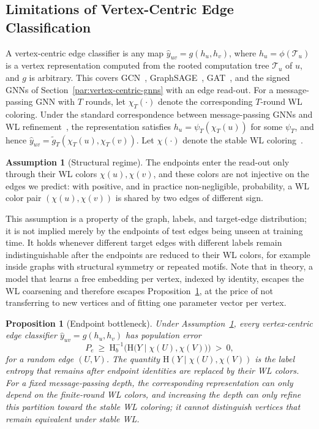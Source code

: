\documentclass[sigconf, review, anonymous]{acmart}
\newcommand{\Hh}{\mathrm{H}}
\theoremstyle{plain}
\newtheorem{proposition}{Proposition}
\theoremstyle{definition}
\newtheorem{assumption}{Assumption}
\begin{document}
\subsection{Limitations of Vertex-Centric Edge Classification}
A vertex-centric edge classifier is any map $\hat y_{uv}=g(h_u,h_v)$, where $h_u=\phi(\mathcal{T}_u)$ is a vertex representation computed from the rooted computation tree $\mathcal{T}_u$ of $u$, and $g$ is arbitrary. This covers GCN~\citep{kipf2017semi}, GraphSAGE~\citep{hamilton2017inductive}, GAT~\citep{velickovic2018graph}, and the signed GNNs of Section~\ref{par:vertex-centric-gnns} with an edge read-out. For a message-passing GNN with $T$ rounds, let $\chi_T(\cdot)$ denote the corresponding $T$-round WL coloring. Under the standard correspondence between message-passing GNNs and WL refinement~\citep{xu2019powerful, morris2019weisfeiler}, the representation satisfies $h_u=\psi_T(\chi_T(u))$ for some $\psi_T$, and hence $\hat y_{uv}=\tilde g_T(\chi_T(u),\chi_T(v))$. Let $\chi(\cdot)$ denote the stable WL coloring~\citep{weisfeiler1968reduction}. 

\begin{assumption}[Structural regime]
\label{as:structural}
The endpoints enter the read-out only through their WL colors $\chi(u),\chi(v)$, and these colors are not injective on the edges we predict: with positive, and in practice non-negligible, probability, a WL color pair $(\chi(u),\chi(v))$ is shared by two edges of different sign.
\end{assumption}

This assumption is a property of the graph, labels, and target-edge distribution; it is not implied merely by the endpoints of test edges being unseen at training time. It holds whenever different target edges with different labels remain indistinguishable after the endpoints are reduced to their WL colors, for example inside graphs with structural symmetry or repeated motifs. Note that in theory, a model that learns a free embedding per vertex, indexed by identity, escapes the WL coarsening and therefore escapes Proposition~\ref{prop:bottleneck}, at the price of not transferring to new vertices and of fitting one parameter vector per vertex.

\begin{proposition}[Endpoint bottleneck]
\label{prop:bottleneck}
Under Assumption~\ref{as:structural}, every vertex-centric edge classifier $\hat y_{uv}=g(h_u,h_v)$ has population error
\[
P_e \ \ge\ \Hh_b^{-1}\Big(\Hh\big(Y\mid \chi(U),\chi(V)\big)\Big)\ >\ 0,
\]
for a random edge $(U,V)$. The quantity $\Hh(Y\mid \chi(U),\chi(V))$ is the label entropy that remains after endpoint identities are replaced by their WL colors. For a fixed message-passing depth, the corresponding representation can only depend on the finite-round WL colors, and increasing the depth can only refine this partition toward the stable WL coloring; it cannot distinguish vertices that remain equivalent under stable WL.  
\end{proposition}
\end{document}

